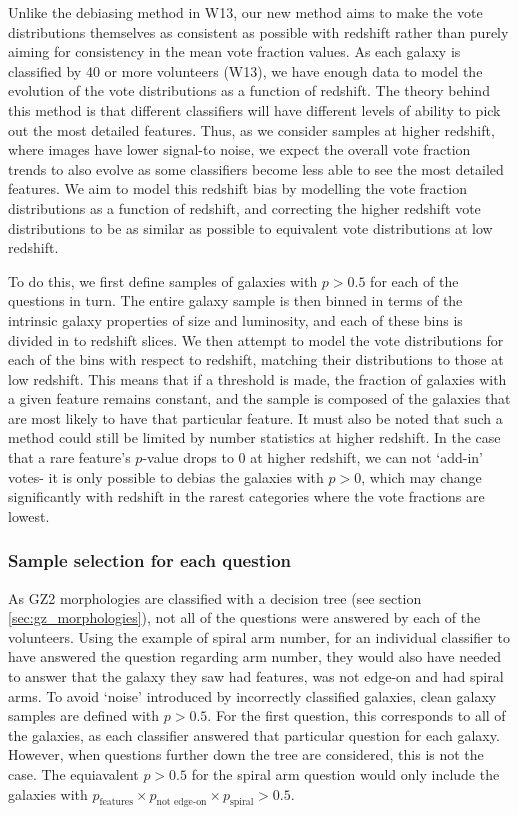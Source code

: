 \documentclass[useAMS,usenatbib]{mn2e}
\begin{document}
Unlike the debiasing method in W13, our new method aims to make the vote distributions themselves as consistent as possible with redshift rather than purely aiming for consistency in the mean vote fraction values. As each galaxy is classified by 40 or more volunteers (W13), we have enough data to model the evolution of the vote distributions as a function of redshift. The theory behind this method is that different classifiers will have different levels of ability to pick out the most detailed features. Thus, as we consider samples at higher redshift, where images have lower signal-to noise, we expect the overall vote fraction trends to also evolve as some classifiers become less able to see the most detailed features. We aim to model this redshift bias by modelling the vote fraction distributions as a function of redshift, and correcting the higher redshift vote distributions to be as similar as possible to equivalent vote distributions at low redshift. 

To do this, we first define samples of galaxies with $p>0.5$ for each of the questions in turn. The entire galaxy sample is then binned in terms of the intrinsic galaxy properties of size and luminosity, and each of these bins is divided in to redshift slices. We then attempt to model the vote distributions for each of the bins with respect to redshift, matching their distributions to those at low redshift. This means that if a threshold is made, the fraction of galaxies with a given feature remains constant, and the sample is composed of the galaxies that are most likely to have that particular feature.  It must also be noted that such a method could still be limited by number statistics at higher redshift. In the case that a rare feature's $p$-value drops to 0 at higher redshift, we can not `add-in' votes- it is only possible to debias the galaxies with $p>0$, which may change significantly with redshift in the rarest categories where the vote fractions are lowest.
\subsubsection{Sample selection for each question}
\label{sec:sample_selection_per_question}

As GZ2 morphologies are classified with a decision tree (see section \ref{sec:gz_morphologies}), not all of the questions were answered by each of the volunteers. Using the example of spiral arm number, for an individual classifier to have answered the question regarding arm number, they would also have needed to answer that the galaxy they saw had features, was not edge-on and had spiral arms. To avoid `noise' introduced by incorrectly classified galaxies, clean galaxy samples are defined with $p > 0.5$. For the first question, this corresponds to all of the galaxies, as each classifier answered that particular question for each galaxy. However, when questions further down the tree are considered, this is not the case. The equiavalent $p>0.5$ for the spiral arm question would only include the galaxies with $p_{\textrm{features}} \times p_{\textrm{not edge-on}} \times p_{\textrm{spiral}} > 0.5$. 
\end{document}
